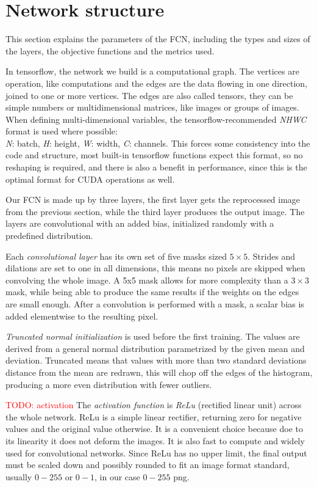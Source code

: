 \documentclass[12pt]{report}
\newcommand\todo[1]{\textcolor{red}{#1}}
\begin{document}
\section{Network structure}
This section explains the parameters of the FCN, including the types and sizes of the layers, the objective functions and the metrics used.\par
In tensorflow, the network we build is a computational graph. The vertices are operation, like computations and the edges are the data flowing in one direction, joined to one or more vertices. The edges are also called tensors, they can be simple numbers or multidimensional matrices, like images or groups of images.
When defining multi-dimensional variables, the tensorflow-recommended \textit{NHWC} format is used where possible:\\
 \textit{N}: batch, \textit{H}: height, \textit{W}: width, \textit{C}: channels. This forces some consistency into the code and structure, most built-in tensorflow functions expect this format, so no reshaping is required, and there is also a benefit in performance, since this is the optimal format for CUDA operations as well.\par
Our FCN is made up by three layers, the first layer gets the reprocessed image from the previous section, while the third layer produces the output image. The layers are convolutional with an added bias, initialized randomly with a predefined distribution.\par
Each \textit{convolutional layer} has its own set of five masks sized $5×5$. Strides and dilations are set to one in all dimensions, this means no pixels are skipped when convolving the whole image. A 5x5 mask allows for more complexity than a $3×3$ mask, while being able to produce the same results if the weights on the edges are small enough. After a convolution is performed with a mask, a scalar bias is added elementwise to the resulting pixel.\par
\textit{Truncated normal initialization} is used before the first training. The values are derived from a general normal distribution parametrized by the given mean and deviation. Truncated means that values with more than two standard deviations distance from the mean are redrawn, this will chop off the edges of the histogram, producing a more even distribution with fewer outliers.\par
\todo{TODO: activation} The \textit{activation function} is \textit{ReLu} (rectified linear unit) across the whole network. ReLu is a simple linear rectifier, returning zero for negative values and the original value otherwise. It is a convenient choice because doe to its linearity it does not deform the images. It is also fast to compute and widely used for convolutional networks. Since ReLu has no upper limit, the final output must be scaled down and possibly rounded to fit an image format standard, usually $0-255$ or $0-1$, in our case $0-255$ png.
\end{document}
